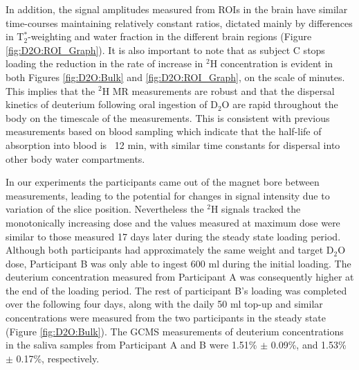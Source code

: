 \documentclass[class=article, crop=false]{standalone}
\begin{document}
In addition, the signal amplitudes measured from ROIs in the brain have similar time-courses maintaining relatively constant ratios, dictated mainly by differences in T$_2^*$-weighting and water fraction in the different brain regions (Figure \ref{fig:D2O:ROI_Graph}). It is also important to note that as subject C stops loading the reduction in the rate of increase in $^2$H concentration is evident in both Figures \ref{fig:D2O:Bulk} and \ref{fig:D2O:ROI_Graph}, on the scale of minutes. This implies that the $^2$H MR measurements are robust and that the dispersal kinetics of deuterium following oral ingestion of D$_2$O are rapid throughout the body on the timescale of the measurements. This is consistent with previous measurements based on blood sampling which indicate that the half-life of absorption into blood is ~12 min, with similar time constants for dispersal into other body water compartments\cite{Davies2001RapidWater,Peronnet2012PharmacokineticHumans}. 

In our experiments the participants came out of the magnet bore between measurements, leading to the potential for changes in signal intensity due to variation of the slice position. Nevertheless the $^2$H signals tracked the monotonically increasing dose and the values measured at maximum dose were similar to those measured 17 days later during the steady state loading period. Although both participants had approximately the same weight and target D$_2$O dose, Participant B was only able to ingest 600 ml during the initial loading. The deuterium concentration measured from Participant A was consequently higher at the end of the loading period. The rest of participant B’s loading was completed over the following four days, along with the daily 50 ml top-up and similar concentrations were measured from the two participants in the steady state (Figure \ref{fig:D2O:Bulk}). The GCMS measurements of deuterium concentrations in the saliva samples from Participant A and B were 1.51\% $\pm$ 0.09\%, and 1.53\% $\pm$ 0.17\%, respectively. 
\end{document}
